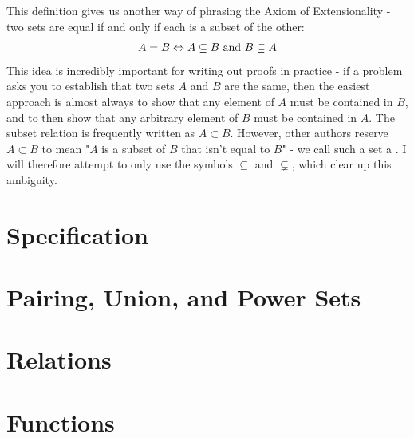 \newpar
This definition gives us another way of phrasing the Axiom of Extensionality - two sets are equal if and only if each is a subset of the other:
\begin{align*}
	A = B \Leftrightarrow A \subseteq B \textnormal{ and } B \subseteq A
\end{align*}
This idea is incredibly important for writing out proofs in practice - if a problem asks you to establish that two sets $A$ and $B$ are the same, then the easiest approach is almost always to show that any element of $A$ must be contained in $B$, and to then show that any arbitrary element of $B$ must be contained in $A$.
\newpar
The subset relation is frequently written as $A \subset B$. However, other authors reserve $A \subset B$ to mean "$A$ is a subset of $B$ that isn't equal to $B$" - we call such a set a . I will therefore attempt to only use the symbols $\subseteq$ and $\subsetneq$, which clear up this ambiguity.
\newpar
\section{Specification}
\section{Pairing, Union, and Power Sets}
\section{Relations}
\section{Functions}
